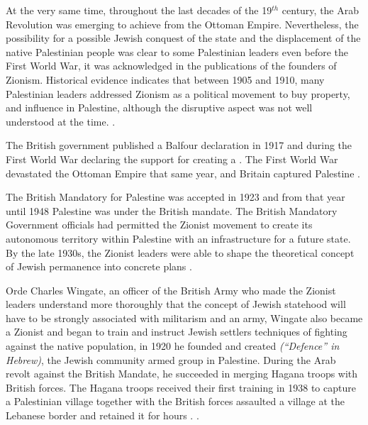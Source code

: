 At the very same time, throughout the last decades of the 19$^{th}$ century, the Arab Revolution was emerging to achieve  from the Ottoman Empire. Nevertheless, the possibility for a possible Jewish conquest of the state and the displacement of the native Palestinian people was clear to some Palestinian leaders even before the First World War, it was acknowledged in the publications of the founders of Zionism. Historical evidence indicates that between 1905 and 1910, many Palestinian leaders addressed Zionism as a political movement to buy property, and influence in Palestine, although the disruptive aspect was not well understood at the time. \citep{Pappe2006}.



 The British government published a Balfour declaration in 1917 and during the First World War declaring the support for creating a . The First World War devastated the Ottoman Empire that same year, and Britain captured Palestine \citep{Morris2004}.  
 
 
 
 
 
 The British Mandatory for Palestine was accepted in 1923 and from that year until 1948 Palestine was under the British mandate. The British Mandatory Government officials had permitted the Zionist movement to create its autonomous territory within Palestine with an infrastructure for a future state. By the late 1930s, the Zionist leaders were able to shape the theoretical concept of Jewish permanence into concrete plans \citep{Pappe2006}.  
 
Orde Charles Wingate, an officer of the British Army who made the Zionist leaders understand more thoroughly that the concept of Jewish statehood will have to be strongly associated with militarism and an army, Wingate also became a Zionist and began to train and instruct Jewish settlers techniques of fighting against the native population, in 1920 he founded and created  \textit{(“Defence” in Hebrew)}, the Jewish community armed group in Palestine. During the Arab revolt against the British Mandate, he succeeded in merging Hagana troops with British forces. The Hagana troops received their first training in 1938 to capture a Palestinian village together with the British forces assaulted a village at the Lebanese border and retained it for hours \citep{Pappe2006}. \cite [p.112]{Fenby2018}. 

